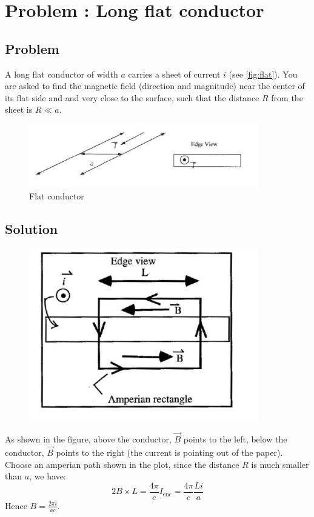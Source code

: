\documentclass[solutions]{esg8022pset}
\date{\today }
\begin{document}
\section{Problem \thesection: Long flat conductor}
\subsection{Problem}
  A long flat conductor of width $a$ carries a sheet of current $i$ (see
  \autoref{fig:flat}). You are asked to find the magnetic field (direction and
  magnitude) near the center of its flat side and and very close to the
  surface, such that the distance $R$ from the sheet is $R \ll a$.

  \begin{figure}[ht]
    \centering
    \includegraphics[width = 10cm]{flat_conductor}
    \caption{Flat conductor}
    \label{fig:flat}
  \end{figure}

\subsection{Solution}

  \begin{figure}[ht]
    \centering
    \includegraphics[width = 10cm]{flat_conductor_sol}
    \label{fig:flatsol}
  \end{figure}

  As shown in the figure, above the conductor, $\vec{B}$ points to the left,
  below the conductor, $\vec{B}$  points to the right (the current is pointing
  out of the paper).  Choose an amperian path shown in the plot, since the
  distance $R$ is much smaller than $a$, we have:
  \begin{equation}
    2B \times L = \frac{4 \pi}{c} I_{\text{enc}} = \frac{4 \pi}{c} \frac{L i}{a}
  \end{equation}
  Hence $B=\frac{2 \pi i}{a c}$.
\end{document}
